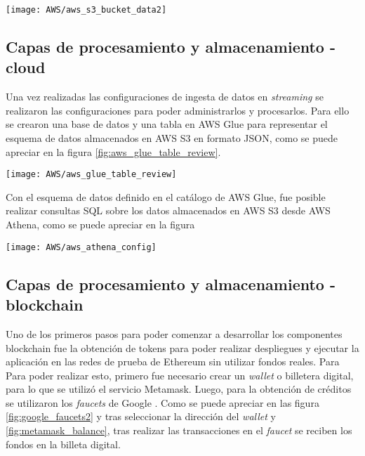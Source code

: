 \begin{center}
   \texttt{[image: AWS/aws\_s3\_bucket\_data2]}
   \label{fig:aws_s3_bucket_data2}
\end{center}


\subsection{Capas de procesamiento y almacenamiento - cloud}

Una vez realizadas las configuraciones de ingesta de datos en \textit{streaming} se realizaron las configuraciones para poder administrarlos y procesarlos.
Para ello se crearon una base de datos y una tabla en AWS Glue para representar el esquema de datos almacenados en AWS S3 en formato JSON, como se puede apreciar en la figura \ref{fig:aws_glue_table_review}.

\begin{center}
   \texttt{[image: AWS/aws\_glue\_table\_review]}
   \label{fig:aws_glue_table_review}
\end{center}

Con el esquema de datos definido en el catálogo de AWS Glue, fue posible realizar consultas SQL sobre los datos almacenados en AWS S3 desde AWS Athena, como se puede apreciar en la figura 

\begin{center}
   \texttt{[image: AWS/aws\_athena\_config]}
   \label{fig:aws_athena_config}
\end{center}





\subsection{Capas de procesamiento y almacenamiento - blockchain}

Uno de los primeros pasos para poder comenzar a desarrollar los componentes blockchain fue la obtención de tokens para poder realizar despliegues y ejecutar la aplicación en las redes de prueba de Ethereum sin utilizar fondos reales. Para Para poder realizar esto, primero fue necesario crear un \textit{wallet} o billetera digital, para lo que se utilizó el servicio Metamask. Luego, para la obtención de créditos se utilizaron los \textit{faucets} de Google \citep{google_faucets}. Como se puede apreciar en las figura \ref{fig:google_faucets2} y tras seleccionar la dirección del \textit{wallet} y \ref{fig:metamask_balance}, tras realizar las transacciones en el \textit{faucet} se reciben los fondos en la billeta digital. 

